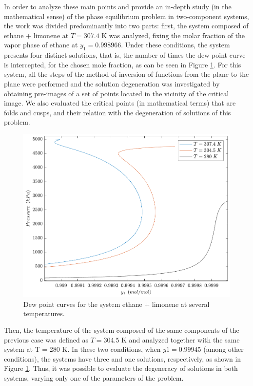 \documentclass[journal=iecred,manuscript=article]{achemso}
\theoremstyle{definition}
\theoremstyle{remark}
\begin{document}
In order to analyze these main points and provide an in-depth study (in the mathematical sense) of the phase equilibrium problem in two-component systems, the work was divided predominantly into two parts: first, the system composed of ethane + limonene at $ T = 307.4 $ K was analyzed, fixing the molar fraction of the vapor phase of ethane at $ y_{1} = 0.998966 $. Under these conditions, the system presents four distinct solutions, that is, the number of times the dew point curve is intercepted, for the chosen mole fraction, as can be seen in Figure \ref{fig:dew_point_curve}. For this system, all the steps of the method of inversion of functions from the plane to the plane were performed and the solution degeneration was investigated by obtaining pre-images of a set of points located in the vicinity of the critical image. We also evaluated the critical points (in mathematical terms) that are folds and cusps, and their relation with the degeneration of solutions of this problem.

\begin{figure}
	\begin{center}
		\includegraphics[scale=0.50]{curvas_ponto_orvalho.pdf}
		\caption{Dew point curves for the system ethane + limonene at several temperatures.}\label{fig:dew_point_curve}
	\end{center}
\end{figure}

Then, the temperature of the system composed of the same components of the previous case was defined as $ T = 304.5 $ K and analyzed together with the same system at T = 280 K. In these two conditions, when $ y1 = 0.99945 $ (among other conditions), the systems have three and one solutions, respectively, as shown in Figure \ref{fig:dew_point_curve}. Thus, it was possible to evaluate the degeneracy of solutions in both systems, varying only one of the parameters of the problem.
\end{document}
